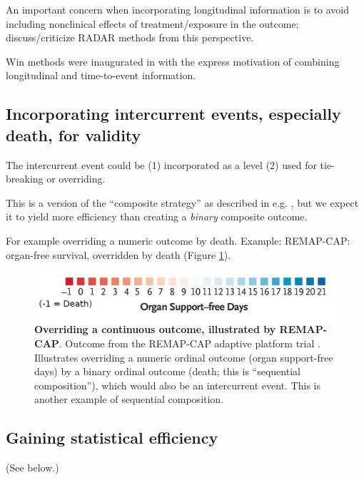 \documentclass[
  11pt,
  fleqn
]{article}
\begin{document}
An important concern when incorporating longitudinal information is
to avoid including nonclinical effects of treatment/exposure in the
outcome; \citet{ongUnlockingDOORHow2023} discuss/criticize RADAR
methods from this perspective.

Win methods were inaugurated in
\citet{finkelsteinCombiningMortalityLongitudinal1999} with the
express motivation of combining longitudinal and time-to-event information.

\subsection{Incorporating intercurrent events, especially death,
for validity}

The intercurrent event could be (1) incorporated as a level (2) used
for tie-breaking or overriding.

This is a version of the ``composite strategy'' as described in e.g.
\citet{kahanEstimandsFrameworkPrimer2024}, but we expect it to yield
more efficiency than creating a \emph{binary} composite outcome.

For example overriding a numeric outcome by death.
Example: REMAP-CAP: organ-free survival, overridden by death
(Figure \ref{fig:remap_cap_override}).

\begin{figure}
  \includegraphics[width=5in]{remap_outcome_extra_cropped.jpg}
  \caption{\textbf{Overriding a continuous outcome, illustrated by
    REMAP-CAP}. Outcome from the REMAP-CAP adaptive
    platform trial
    \citep{theremap-capinvestigatorsInterleukin6ReceptorAntagonists2021}.
    Illustrates overriding a numeric ordinal outcome (organ
    support-free days) by a binary ordinal outcome (death; this is
    ``sequential composition''), which
    would also be an intercurrent event. This is another example of
  sequential composition.}
  \label{fig:remap_cap_override}
\end{figure}

\subsection{Gaining statistical efficiency}

(See below.)
\end{document}
